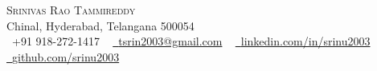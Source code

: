 \documentclass[letterpaper,11pt]{article}
\begin{document}

\begin{center}

    {\Huge \scshape Srinivas Rao Tammireddy} \\ \vspace{2pt}
    Chinal, Hyderabad, Telangana 500054 \\ \vspace{1pt}
    \small \raisebox{-0.1\height}
    \faPhone\ +91 918-272-1417 ~
    \href{mailto:tsrin2003@gmail.com}{\raisebox{-0.2\height}\faEnvelope\  {tsrin2003@gmail.com}} ~
    \href{https://linkedin.com/in/srinu2003/}{\raisebox{-0.2\height}\faLinkedin\ {linkedin.com/in/srinu2003}}  ~
    \href{https://github.com/srinu2003}{\raisebox{-0.2\height}\faGithub\ {github.com/srinu2003}}
    \vspace{-8pt}
  \end{center}


\end{document}

